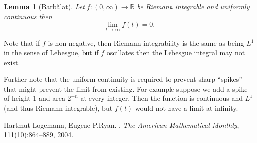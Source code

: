 \documentclass[12pt]{article}
\theoremstyle{theorem}
\newtheorem*{lemma}{Lemma}
\theoremstyle{definition}
\begin{document}
\begin{lemma}[Barb\u{a}lat]
Let $f \colon (0,\infty) \to {\mathbb{R}}$ be Riemann integrable and uniformly continuous then
\begin{equation*}
\lim_{t \to \infty} f(t) = 0 .
\end{equation*}
\end{lemma}

Note that if $f$ is non-negative, then Riemann integrability is the same as being $L^1$ in the sense of Lebesgue, but if $f$ oscillates then the Lebesgue integral may not exist.

Further note that the uniform continuity is required to prevent sharp ``spikes'' that might prevent the limit from existing.  For example suppose we add a spike of height 1 and area $2^{-n}$ at every integer.  Then the function is continuous and $L^1$ (and thus Riemann integrable), but
$f(t)$ would not have a limit at infinity.

\begin{thebibliography}{9}
Hartmut Logemann, Eugene P.\@ Ryan.
.
\emph{The American Mathematical Monthly}, 111(10):864--889,
2004.
\end{thebibliography}
\end{document}
